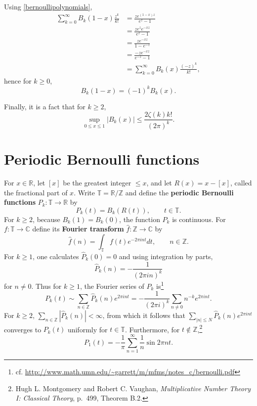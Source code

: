 \documentclass{article}
\theoremstyle{definition}
\theoremstyle{definition}
\begin{document}
Using \eqref{bernoullipolynomials},
\begin{align*}
\sum_{k=0}^\infty B_k(1-x) \frac{z^k}{k!} &= \frac{ze^{(1-x)z}}{e^z-1}\\
&=\frac{ze^z e^{-xz}}{e^z-1}\\
&=\frac{ze^{-xz}}{1-e^{-z}}\\
&=\frac{-ze^{-xz}}{e^{-z}-1}\\
&=\sum_{k=0}^\infty B_k(x) \frac{(-z)^k}{k!},
\end{align*}
hence for $k \geq 0$,
\[
B_k(1-x) = (-1)^k B_k(x).
\]

Finally, it is a fact that for $k \geq 2$,
\begin{equation}
\sup_{0 \leq x \leq 1} |B_k(x)| \leq \frac{2\zeta(k) k!}{(2\pi)^k}.
\label{supremum}
\end{equation}


\section{Periodic Bernoulli functions}
For $x \in \mathbb{R}$, let $[ x ]$ be the greatest integer $\leq x$, and let $R(x)=x-[x]$, called the fractional part of $x$.
Write $\mathbb{T}=\mathbb{R}/\mathbb{Z}$ and define the 
\textbf{periodic Bernoulli functions} $P_k:\mathbb{T} \to \mathbb{R}$ by
\[
P_k(t) = B_k(R(t)),\qquad t \in \mathbb{T}.
\] 
For $k \geq 2$, because $B_k(1)=B_k(0)$, the function $P_k$ is continuous. 
For $f:\mathbb{T} \to \mathbb{C}$ define its \textbf{Fourier transform} $\widehat{f}:\mathbb{Z} \to \mathbb{C}$ by
\[
\widehat{f}(n) = \int_\mathbb{T} f(t) e^{-2\pi int} dt,\qquad n \in \mathbb{Z}.
\]
For $k \geq 1$, one calculates $\widehat{P}_k(0)=0$ and using integration by parts,
\[
\widehat{P}_k(n)= - \frac{1}{(2\pi in)^k}
\]
for
$n \neq 0$.
Thus for $k \geq 1$, the Fourier series of $P_k$ is\footnote{cf. \url{http://www.math.umn.edu/~garrett/m/mfms/notes_c/bernoulli.pdf}}
\[
P_k(t) \sim \sum_{n \in \mathbb{Z}} \widehat{P}_k(n) e^{2\pi int} = -\frac{1}{(2\pi i)^k} \sum_{n \neq 0} n^{-k} e^{2\pi int}.
\]
For $k \geq 2$, $\sum_{n \in \mathbb{Z}} |\widehat{P}_k(n)|<\infty$, from which it follows that $\sum_{|n| \leq N}  \widehat{P}_k(n) e^{2\pi int}$
converges to $P_k(t)$ uniformly for $t \in \mathbb{T}$.
Furthermore, for $t \not \in \mathbb{Z}$,\footnote{Hugh L. Montgomery and Robert C. Vaughan,
{\em Multiplicative Number Theory I: Classical Theory}, p.~499, Theorem B.2.}
\[
P_1(t) = - \frac{1}{\pi} \sum_{n=1}^\infty \frac{1}{n} \sin 2\pi nt.
\]
\end{document}
